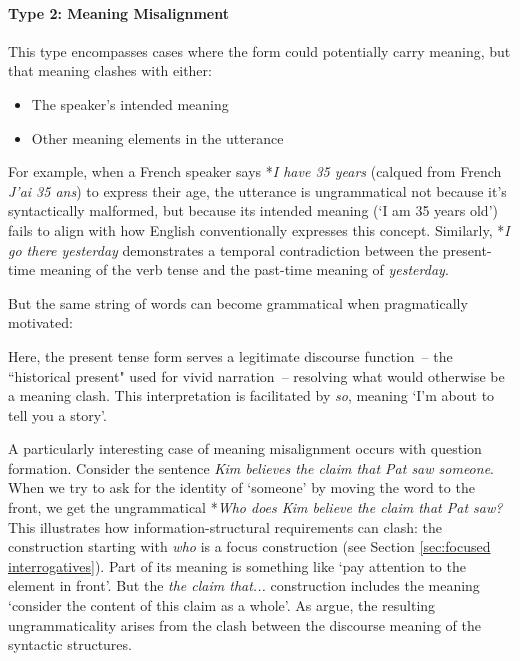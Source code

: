\paragraph*{Type 2: Meaning Misalignment} This type encompasses cases where the form could potentially carry meaning, but that meaning clashes with either:
\begin{itemize}[noitemsep]
    \item The speaker's intended meaning
    \item Other meaning elements in the utterance
\end{itemize}

For example, when a French speaker says *\textit{I have 35 years} (calqued from French \textit{J'ai 35 ans}) to express their age, the utterance is ungrammatical not because it's syntactically malformed, but because its intended meaning (`I am 35 years old') fails to align with how English conventionally expresses this concept. Similarly, *\textit{I go there yesterday} demonstrates a temporal contradiction between the present-time meaning of the verb tense and the past-time meaning of \textit{yesterday}.

But the same string of words can become grammatical when pragmatically motivated:
\z

Here, the present tense form serves a legitimate discourse function~-- the ``historical present" used for vivid narration~-- resolving what would otherwise be a meaning clash. This interpretation is facilitated by \textit{so}, meaning `I'm about to tell you a story'.

A particularly interesting case of meaning misalignment occurs with question formation. Consider the sentence \textit{Kim believes the claim that Pat saw someone}. When we try to ask for the identity of `someone' by moving the word to the front, we get the ungrammatical *\textit{Who does Kim believe the claim that Pat saw?} This illustrates how information-structural requirements can clash: the construction starting with \textit{who} is a focus construction (see Section \ref{sec:focused interrogatives}). Part of its meaning is something  like `pay attention to the element in front'. But the \textit{the claim that...} construction includes the meaning `consider the content of this claim as a whole'. As \citet{cuneo_goldberg_2022} argue, the resulting ungrammaticality arises from the clash between the discourse meaning of the syntactic structures.

